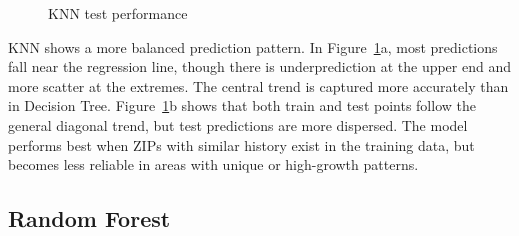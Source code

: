 \begin{figure}[!ht]
    \centering
    \hfill
    \caption{KNN test performance}
    \caption*{\hspace{1em}}
    \label{fig:knn_results}
\end{figure}
\FloatBarrier

KNN shows a more balanced prediction pattern. In Figure~\ref{fig:knn_results}a, most predictions fall near the regression line, though there is underprediction at the upper end and more scatter at the extremes. The central trend is captured more accurately than in Decision Tree. Figure~\ref{fig:knn_results}b shows that both train and test points follow the general diagonal trend, but test predictions are more dispersed. The model performs best when ZIPs with similar history exist in the training data, but becomes less reliable in areas with unique or high-growth patterns.

\subsection{Random Forest}


